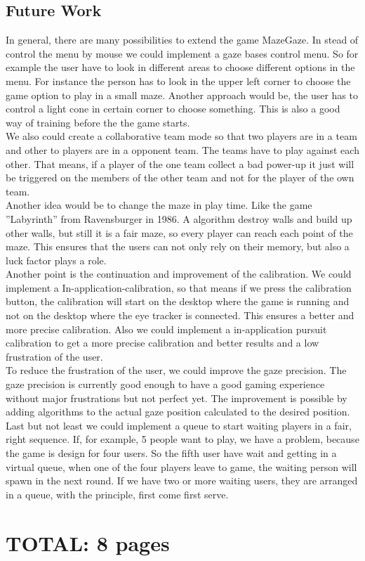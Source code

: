 \documentclass{sigchi}
\begin{document}
\subsection{Future Work}
In general, there are many possibilities to extend the game MazeGaze. In stead of control the menu by mouse we could implement a gaze bases control menu. So for example the user have to look in different areas to choose different options in the menu. For instance the person has to look in the upper left corner to choose the game option to play in a small maze. Another approach would be, the user has to control a light cone in certain corner to choose something. This is also a good way of training before the the game starts.\\ 
We also could create a collaborative team mode so that two players are in a team and other to players are in a opponent team. The teams have to play against each other. That means, if a player of the one team collect a bad power-up it just will be triggered on the members of the other team and not for the player of the own team.\\ 
Another idea would be to change the maze in play time. Like the game ''Labyrinth'' from Ravensburger in 1986. A algorithm destroy walls and build up other walls, but still it is a fair maze, so every player can reach each point of the maze. This ensures that the users can not only rely on their memory, but also a luck factor plays a role.\\
Another point is the continuation and improvement of the calibration. We could implement a In-application-calibration, so that means if we press the calibration button, the calibration will start on the desktop where the game is running and not on the desktop where the eye tracker is connected. This ensures a better and more precise calibration. Also we could implement a  in-application pursuit calibration to get a more precise calibration and better results and a low frustration of the user.\\ 
To reduce the frustration of the user, we could improve the gaze precision. The gaze precision is currently good enough to have a good gaming experience without major frustrations but not perfect yet. The improvement is possible by adding algorithms to the actual gaze position calculated to the desired position. \\
Last but not least we could implement a queue to start waiting players in a fair, right sequence. If, for example, 5 people want to play, we have a problem, because the game is design for four users. So the fifth user have wait and getting in a virtual queue, when one of the four players leave to game, the waiting person will spawn in the next round. If we have two or more waiting users, they are arranged in a queue, with the principle, first come first serve.

\section{TOTAL: 8 pages}

\balance{}




\end{document}
